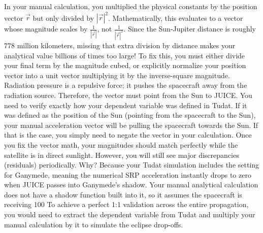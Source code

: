 {}In your manual calculation, you multiplied the physical constants by the position vector $\vec{r}$ but only divided by $|\vec{r}|^2$. Mathematically, this evaluates to a vector whose magnitude scales by $\frac{1}{|\vec{r}|}$, not $\frac{1}{|\vec{r}|^2}$. Since the Sun-Jupiter distance is roughly 778 million kilometers, missing that extra division by distance makes your analytical value billions of times too large!\markdownRendererInterblockSeparator
{}To fix this, you must either divide your final term by the magnitude cubed, or explicitly normalize your position vector into a unit vector  multiplying it by the inverse-square magnitude.\markdownRendererInterblockSeparator
{}
\markdownRendererSectionEnd \markdownRendererSectionBegin
{}\markdownRendererInterblockSeparator
{}Radiation pressure is a repulsive force; it pushes the spacecraft away from the radiation source. Therefore, the vector must point from the Sun to JUICE.\markdownRendererInterblockSeparator
{}You need to verify exactly how your  dependent variable was defined in Tudat. If it was defined as the position of the Sun  (pointing from the spacecraft to the Sun), your manual acceleration vector will be pulling the spacecraft towards the Sun. If that is the case, you simply need to negate the vector in your calculation.\markdownRendererInterblockSeparator
{}
\markdownRendererSectionEnd \markdownRendererSectionBegin
{}\markdownRendererInterblockSeparator
{}Once you fix the vector math, your magnitudes should match perfectly while the satellite is in direct sunlight. However, you will still see major discrepancies (residuals) periodically.\markdownRendererInterblockSeparator
{}Why? Because your Tudat simulation includes the  setting for Ganymede, meaning the numerical SRP acceleration instantly drops to zero when JUICE passes into Ganymede's shadow. Your manual analytical calculation does not have a shadow function built into it, so it assumes the spacecraft is receiving 100\markdownRendererInterblockSeparator
{}To achieve a perfect 1:1 validation across the entire propagation, you would need to extract the  dependent variable from Tudat and multiply your manual calculation by it to simulate the eclipse drop-offs.\markdownRendererInterblockSeparator
